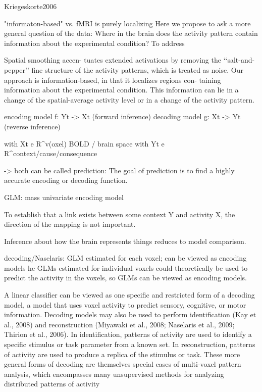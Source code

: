 \documentclass[authoryear,review,3p]{elsarticle}
\begin{document}
Kriegeskorte2006

"informaton-based" vs. fMRI is purely localizing
Here we propose to ask a more general question of the data: Where in the brain does the activity pattern contain information about the experimental condition? To address

Spatial smoothing accen- tuates extended activations by removing the ‘‘salt-and-pepper’’ fine structure of the activity patterns, which is treated as noise.
Our approach is information-based, in that it localizes regions con- taining information about the experimental condition. This information can lie in a change of the spatial-average activity level or in a change of the activity pattern.


encoding model f: Yt -> Xt (forward inference)
decoding model g: Xt -> Yt (reverse inference)

with Xt e R^v(oxel) BOLD / brain space
with Yt e R^context/cause/consequence

-> both can be called prediction:
The goal of prediction is to find a highly accurate encoding or decoding function.

GLM: mass univariate encoding model


To establish that a link exists between some context Y and activity X, the direction of the mapping is not important.

Inference about how the brain represents things reduces to model comparison.





decoding/Naselaris:
GLM estimated for each voxel; can be viewed as encoding models
he GLMs estimated for individual voxels could theoretically be used to predict the activity in the voxels, so GLMs can be viewed as encoding models.

A linear classifier can be viewed as one specific and restricted form of a decoding model, a model that uses voxel activity to predict sensory, cognitive, or motor information. Decoding models may also be used to perform identification (Kay et al., 2008) and reconstruction (Miyawaki et al., 2008; Naselaris et al., 2009; Thirion et al., 2006). In identification, patterns of activity are used to identify a specific stimulus or task parameter from a known set. In reconstruction, patterns of activity are used to produce a replica of the stimulus or task. These more general forms of decoding are themselves special cases of multi-voxel pattern analysis, which encompasses many unsupervised methods for analyzing distributed patterns of activity
\end{document}
